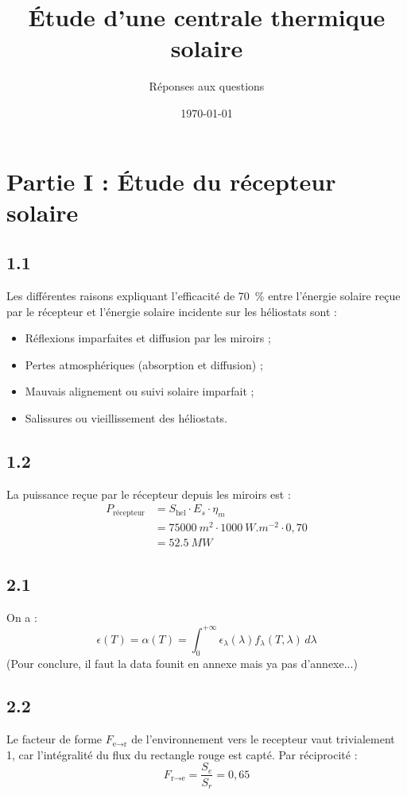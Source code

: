 \documentclass[12pt]{article}
\title{Étude d'une centrale thermique solaire}
\author{Réponses aux questions}
\date{\today}
\begin{document}
\maketitle

\section*{Partie I : Étude du récepteur solaire}

\subsection*{1.1}
Les différentes raisons expliquant l'efficacité de \SI{70}{\percent} entre l'énergie solaire reçue par le récepteur et l'énergie solaire incidente sur les héliostats sont :
\begin{itemize}
  \item Réflexions imparfaites et diffusion par les miroirs ;
  \item Pertes atmosphériques (absorption et diffusion) ;
  \item Mauvais alignement ou suivi solaire imparfait ;
  \item Salissures ou vieillissement des héliostats.
\end{itemize}

\subsection*{1.2}
La puissance reçue par le récepteur depuis les miroirs est :
\begin{align*}
P_{\text{récepteur}} &= S_{\text{hel}} \cdot E_s \cdot \eta_m \\
&= \SI{75000}{m^2} \cdot \SI{1000}{W.m^{-2}} \cdot 0{,}70 \\
&= \boxed{\SI{52.5}{MW}}
\end{align*}

\subsection*{2.1}
On a :
\[
\epsilon(T) = \alpha(T) = \int_{0}^{+\infty} \epsilon_{\lambda}(\lambda) f_{\lambda}(T, \lambda) \, d\lambda
\]
(Pour conclure, il faut la data founit en annexe mais ya pas d'annexe...)

\subsection*{2.2}
Le facteur de forme \( F_{\text{e} \rightarrow \text{r}} \) de l'environnement vers le recepteur vaut trivialement 1, car l'intégralité du flux du rectangle rouge est capté. Par réciprocité :
\[
F_{\text{r} \rightarrow \text{e}} = \frac{S_e}{S_r} = \boxed{0{,}65}
\]
\end{document}
